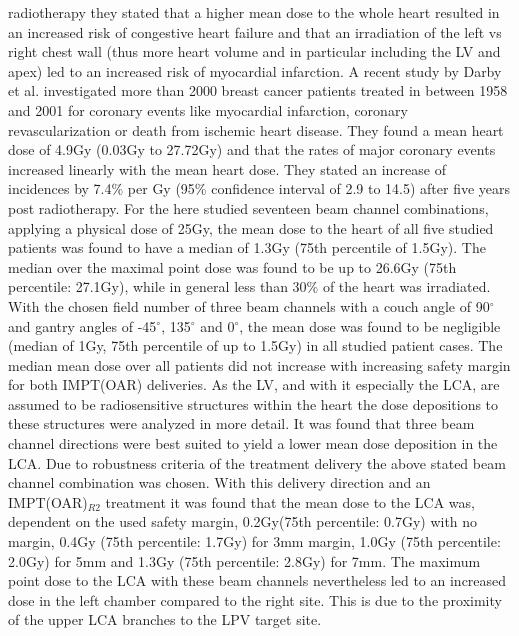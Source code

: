 radiotherapy they stated that a higher mean dose to the whole heart resulted in an increased risk of congestive heart failure and 
that an irradiation of the left vs right chest wall (thus more heart volume and in particular including the LV and apex) led to an 
increased risk of myocardial infarction.\newline
\newline
A recent study by Darby et al. \cite{Dar13} investigated more than 2000 breast cancer patients treated in between 1958 and 2001 
for coronary events like myocardial infarction, coronary revascularization or death from ischemic heart disease. They found a mean 
heart dose of 4.9Gy (0.03Gy to 27.72Gy) and that the rates of major coronary events increased linearly with the mean heart dose. 
They stated an increase of incidences by 7.4\% per Gy (95\% confidence interval of 2.9 to 14.5) after five years post radiotherapy.
\newpage
For the here studied seventeen beam channel combinations, applying a physical dose of 25Gy, the mean dose to the heart of all five studied 
patients was found to have a median of 1.3Gy (75th percentile of 1.5Gy). The median over the maximal point dose was 
found to be up to 26.6Gy (75th percentile: 27.1Gy), while in general less than 30\% of the heart was irradiated. 
With the chosen field number of three beam channels with a couch angle of 90$^{\circ}$ and gantry angles of -45$^{\circ}$, 
135$^{\circ}$ and 0$^{\circ}$, the mean dose was found to be negligible (median of 1Gy, 75th percentile of up to 1.5Gy) in all 
studied patient cases. The median mean dose over all patients did not increase with increasing safety margin for both IMPT(OAR) deliveries. 
As the LV, and with it especially the LCA, are assumed to be radiosensitive structures within the heart the dose 
depositions to these structures were analyzed in more detail. It was found that three beam channel directions were best suited to yield a lower 
mean dose deposition in the LCA. Due to robustness criteria of the treatment delivery the above stated beam channel combination was 
chosen. With this delivery direction and an IMPT(OAR)$_{R2}$ treatment it was found that the mean dose to the LCA was, dependent on the 
used safety margin, 0.2Gy(75th percentile: 0.7Gy) with no margin, 0.4Gy (75th percentile: 1.7Gy) for 3mm margin, 1.0Gy (75th percentile: 
2.0Gy) for 5mm and 1.3Gy (75th percentile: 2.8Gy) for 7mm. The maximum point dose to the LCA with these beam channels nevertheless led to 
an increased dose in the left chamber compared to the right site. This is due to the proximity of the upper LCA branches 
to the LPV target site. 

